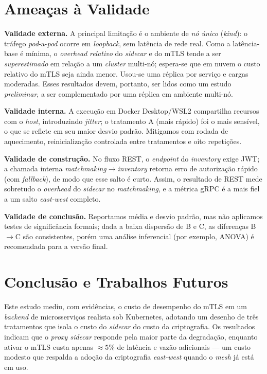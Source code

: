 \documentclass[12pt]{article}
\begin{document}
\section{Amea\c{c}as \`a Validade}

\textbf{Validade externa.} A principal limita\c{c}\~ao \'e o ambiente de \emph{n\'o \'unico} (\textit{kind}): o tr\'afego \textit{pod}-a-\textit{pod} ocorre em \textit{loopback}, sem lat\^encia de rede real. Como a lat\^encia-base \'e m\'inima, o \textit{overhead} \emph{relativo} do \textit{sidecar} e do mTLS tende a ser \emph{superestimado} em rela\c{c}\~ao a um \textit{cluster} multi-n\'o; espera-se que em nuvem o custo relativo do mTLS seja ainda menor. Usou-se uma r\'eplica por servi\c{c}o e cargas moderadas. Esses resultados devem, portanto, ser lidos como um estudo \emph{preliminar}, a ser complementado por uma r\'eplica em ambiente multi-n\'o.

\textbf{Validade interna.} A execu\c{c}\~ao em Docker Desktop/WSL2 compartilha recursos com o \textit{host}, introduzindo \textit{jitter}; o tratamento A (mais r\'apido) foi o mais sens\'ivel, o que se reflete em seu maior desvio padr\~ao. Mitigamos com rodada de aquecimento, reinicializa\c{c}\~ao controlada entre tratamentos e oito repeti\c{c}\~oes.

\textbf{Validade de constru\c{c}\~ao.} No fluxo REST, o \textit{endpoint} do \textit{inventory} exige JWT; a chamada interna \textit{matchmaking}$\rightarrow$\textit{inventory} retorna erro de autoriza\c{c}\~ao r\'apido (com \textit{fallback}), de modo que esse salto \'e curto. Assim, o resultado de REST mede sobretudo o \textit{overhead} do \textit{sidecar} no \textit{matchmaking}, e a m\'etrica gRPC \'e a mais fiel a um salto \textit{east-west} completo.

\textbf{Validade de conclus\~ao.} Reportamos m\'edia e desvio padr\~ao, mas n\~ao aplicamos testes de signific\^ancia formais; dada a baixa dispers\~ao de B e C, as diferen\c{c}as B$\rightarrow$C s\~ao consistentes, por\'em uma an\'alise inferencial (por exemplo, ANOVA) \'e recomendada para a vers\~ao final.

\section{Conclus\~ao e Trabalhos Futuros}

Este estudo mediu, com evid\^encias, o custo de desempenho do mTLS em um \textit{backend} de microsservi\c{c}os realista sob Kubernetes, adotando um desenho de tr\^es tratamentos que isola o custo do \textit{sidecar} do custo da criptografia. Os resultados indicam que o \textit{proxy sidecar} responde pela maior parte da degrada\c{c}\~ao, enquanto ativar o mTLS custa apenas $\approx 5\%$ de lat\^encia e vaz\~ao adicionais --- um custo modesto que respalda a ado\c{c}\~ao da criptografia \textit{east-west} quando o \textit{mesh} j\'a est\'a em uso.
\end{document}
